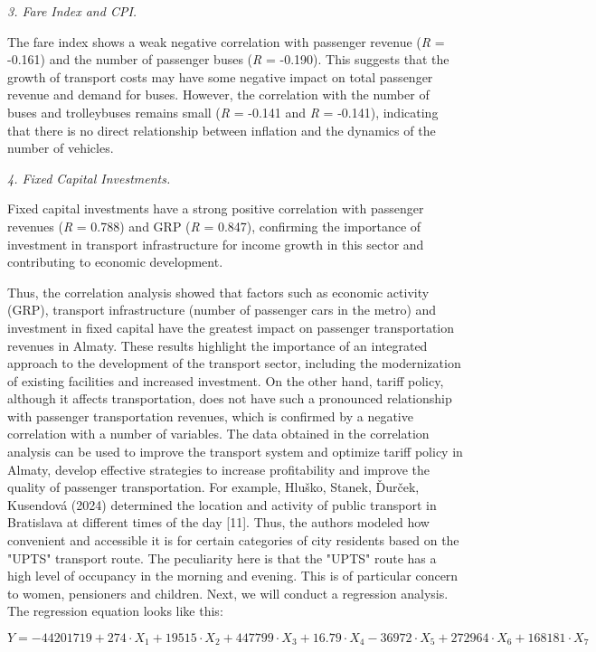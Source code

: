 \begin{multicols}{2}
\emph{3. Fare Index and CPI.}

The fare index shows a weak negative correlation with passenger revenue
(\emph{R} = -0.161) and the number of passenger buses (\emph{R} =
-0.190). This suggests that the growth of transport costs may have some
negative impact on total passenger revenue and demand for buses.
However, the correlation with the number of buses and trolleybuses
remains small (\emph{R} = -0.141 and \emph{R} = -0.141), indicating that
there is no direct relationship between inflation and the dynamics of
the number of vehicles.

\emph{4. Fixed Capital Investments.}

Fixed capital investments have a strong positive correlation with
passenger revenues (\emph{R} = 0.788) and GRP (\emph{R} = 0.847),
confirming the importance of investment in transport infrastructure for
income growth in this sector and contributing to economic development.

Thus, the correlation analysis showed that factors such as economic
activity (GRP), transport infrastructure (number of passenger cars in
the metro) and investment in fixed capital have the greatest impact on
passenger transportation revenues in Almaty. These results highlight the
importance of an integrated approach to the development of the transport
sector, including the modernization of existing facilities and increased
investment. On the other hand, tariff policy, although it affects
transportation, does not have such a pronounced relationship with
passenger transportation revenues, which is confirmed by a negative
correlation with a number of variables. The data obtained in the
correlation analysis can be used to improve the transport system and
optimize tariff policy in Almaty, develop effective strategies to
increase profitability and improve the quality of passenger
transportation. For example, Hluško, Stanek, Ďurček, Kusendová (2024)
determined the location and activity of public transport in Bratislava
at different times of the day {[}11{]}. Thus, the authors modeled how
convenient and accessible it is for certain categories of city residents
based on the "UPTS" transport route. The peculiarity here is that the
"UPTS" route has a high level of occupancy in the morning and evening.
This is of particular concern to women, pensioners and children. Next,
we will conduct a regression analysis. The regression equation looks
like this:
\end{multicols}

\begin{equation*}
    Y = -44201719 + 274 \cdot X_1 + 19515 \cdot X_2 + 447799 \cdot X_3 
    + 16.79 \cdot X_4 - 36972 \cdot X_5 + 272964 \cdot X_6 + 168181 \cdot X_7
\end{equation*}

